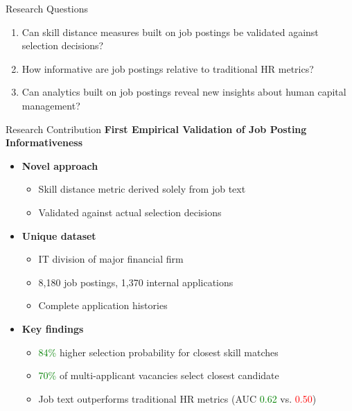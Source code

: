 \documentclass{beamer}
\begin{document}
\begin{frame}{Research Questions}
\begin{enumerate}
    \item Can skill distance measures built on job postings be validated against selection decisions?
    \item How informative are job postings relative to traditional HR metrics?
    \item Can analytics built on job postings reveal new insights about human capital management?
\end{enumerate}
\end{frame}

\begin{frame}{Research Contribution}
\textbf{First Empirical Validation of Job Posting Informativeness}
\begin{itemize}
    \item \textbf{Novel approach}
    \begin{itemize}
        \item Skill distance metric derived solely from job text
        \item Validated against actual selection decisions
    \end{itemize}
    \item \textbf{Unique dataset}
    \begin{itemize}
        \item IT division of major financial firm
        \item 8,180 job postings, 1,370 internal applications
        \item Complete application histories
    \end{itemize}
    \item \textbf{Key findings}
    \begin{itemize}
        \item \textcolor{green}{84\%} higher selection probability for closest skill matches
        \item \textcolor{green}{70\%} of multi-applicant vacancies select closest candidate
        \item Job text outperforms traditional HR metrics (AUC \textcolor{green}{0.62} vs. \textcolor{red}{0.50})
    \end{itemize}
\end{itemize}
\end{frame}
\end{document}
